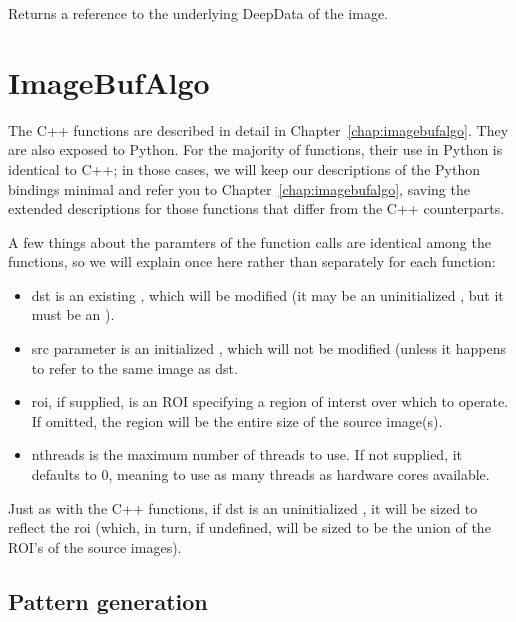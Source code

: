 Returns a reference to the underlying {\cf DeepData} of the image.
\apiend




\newpage
\section{ImageBufAlgo}
\label{sec:pythonimagebufalgo}

The C++ \IBA functions are described in detail in
Chapter~\ref{chap:imagebufalgo}.  They are also exposed to Python.
For the majority of \IBA functions, their use in Python is identical
to C++; in those cases, we will keep our descriptions of the Python
bindings minimal and refer you to Chapter~\ref{chap:imagebufalgo}, saving
the extended descriptions for those functions that differ from the C++
counterparts.

A few things about the paramters of the \IBA function calls are identical
among the functions, so we will explain once here rather than separately for
each function:

\begin{itemize}
\item {\cf dst} is an existing \ImageBuf, which will be modified (it may be
an uninitialized \ImageBuf, but it must be an \ImageBuf).
\item {\cf src} parameter is an initialized \ImageBuf, which will not be
modified (unless it happens to refer to the same image as {\cf dst}.
\item {\cf roi}, if supplied, is an {\cf ROI} specifying a region of interst
over which to operate. If omitted, the region will be the entire size of the
source image(s).
\item {\cf nthreads} is the maximum number of threads to use. If not
supplied, it defaults to 0, meaning to use as many threads as hardware cores
available.
\end{itemize}

Just as with the C++ \IBA functions, if {\cf dst} is an uninitialized
\ImageBuf, it will be sized to reflect the {\cf roi} (which, in turn, if
undefined, will be sized to be the union of the ROI's of the source 
images).

\subsection{Pattern generation}
\label{sec:iba:py:patterns}

 

